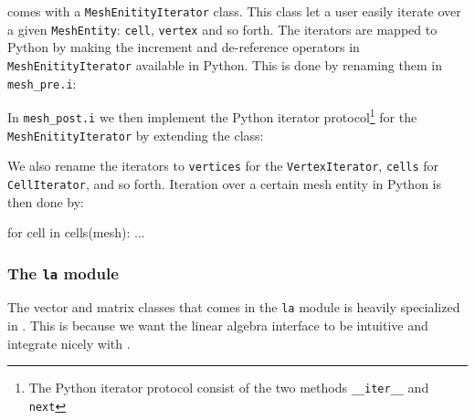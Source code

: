 \begin{code}
\dolfin comes with a \texttt{Mesh}\-\texttt{Enitity}\-\texttt{Iterator} class. This class let a user easily iterate over a given \texttt{MeshEntity}: \texttt{cell}, \texttt{vertex} and so forth. The iterators are mapped to Python by making the increment and de-reference operators in \texttt{MeshEnitityIterator} available in Python. This is done by renaming them in \texttt{mesh\_pre.i}:
\begin{code}
\end{code}
In \texttt{mesh\_post.i} we then implement the Python iterator protocol\footnote{The Python iterator protocol consist of the two methods \texttt{\_\_iter\_\_} and \texttt{next}} for the \texttt{Mesh}\-\texttt{Enitity}\-\texttt{Iterator} by extending the class:
We also rename the iterators to \texttt{vertices} for the \texttt{VertexIterator}, \texttt{cells} for \texttt{CellIterator}, and so forth. Iteration over a certain mesh entity in Python is then done by:
\begin{code}
for cell in cells(mesh):
    ...
\end{code}

\subsubsection{The \texttt{la} module}
The vector and matrix classes that comes in the \texttt{la} module is heavily specialized in \pydolfin. This is because we want the linear algebra interface to be intuitive and integrate nicely with \numpy.\par


\end{code}
